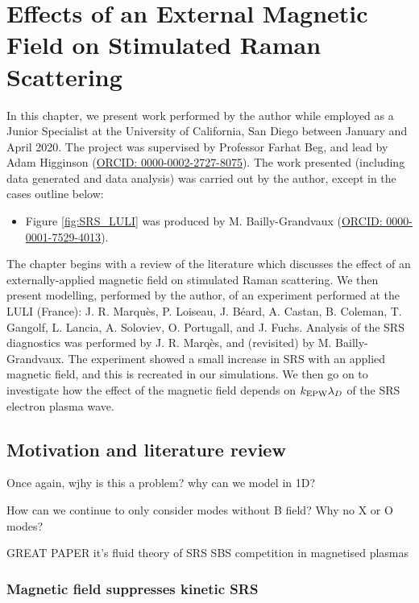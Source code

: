 \chapter{Effects of an External Magnetic Field on Stimulated Raman Scattering}
\label{chp:magSRS}

In this chapter, we present work performed by the author while employed as a Junior Specialist at the University of California, San Diego between January and April 2020. The project was supervised by Professor Farhat Beg, and lead by Adam Higginson (\href{https://orcid.org/0000-0002-2727-8075}{ORCID: 0000-0002-2727-8075}). The work presented (including data generated and data analysis) was carried out by the author, except in the cases outline below:
\begin{itemize}
\item Figure \ref{fig:SRS_LULI} was produced by M. Bailly-Grandvaux (\href{https://orcid.org/0000-0001-7529-4013}{ORCID: 0000-0001-7529-4013}).
\end{itemize}

The chapter begins with a review of the literature which discusses the effect of an externally-applied magnetic field on stimulated Raman scattering. We then present modelling, performed by the author, of an experiment performed at the \acrlong{LULI} (France): J. R. Marqu\`es, P. Loiseau, J. B\'eard, A. Castan, B. Coleman, T. Gangolf, L. Lancia, A. Soloviev, O. Portugall, and J. Fuchs. Analysis of the SRS diagnostics was performed by J. R. Marq\`es, and (revisited) by M. Bailly-Grandvaux.  The experiment showed a small increase in SRS with an applied magnetic field, and this is recreated in our simulations. We then go on to investigate how the effect of the magnetic field depends on $k_\mathrm{EPW}\lambda_D$ of the SRS electron plasma wave.

\section{Motivation and literature review}


Once again, wjhy is this a problem? why can we model in 1D? 

How can we continue to only consider modes without B field? Why no X or O modes?

GREAT PAPER it's fluid theory of SRS SBS competition in magnetised plasmas\citep{Vyas2016}

\subsection{Magnetic field suppresses kinetic SRS}

